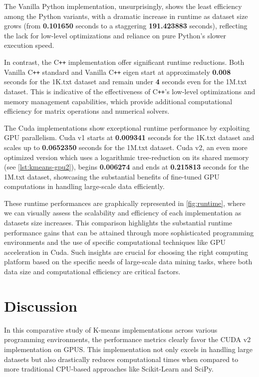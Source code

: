 \documentclass{article}
\begin{document}
  The {\sc Vanilla Python} implementation, unsurprisingly, shows the least efficiency
  among the {\sc Python} variants, with a dramatic increase in runtime as dataset
  size grows (from {\bf 0.101650} seconds to a staggering {\bf 191.423883} seconds),
  reflecting the lack for low-level optimizations and reliance on pure {\sc Python}'s
  slower execution speed. \medskip

  In contrast, the {\sc C{\tt ++}} implementation offer significant runtime reductions.
  Both {\sc Vanilla C{\tt++} standard} and {\sc Vanilla C{\tt++} eigen} start at
  approximately {\bf 0.008} seconds for the {\sf 1K.txt} dataset and remain under
  {\bf 4} seconds even for the {\sf 1M.txt} dataset. This is indicative of the
  effectiveness of C{\tt++}'s low-level optimizations and memory management capabilities,
  which provide additional computational efficiency for matrix operations and numerical
  solvers. \medskip

  The {\sc Cuda} implementations show exceptional runtime performance by exploiting
  {\sc GPU} parallelism. {\sc Cuda v1} starts at {\bf 0.009341} seconds for the
  {\sf 1K.txt} dataset and scales up to {\bf 0.0652350} seconds for the {\sf 1M.txt}
  dataset. {\sc Cuda v2}, an even more optimized version which uses a logarithmic
  tree-reduction on its shared memory (see \autoref{lst:kmeans-gpu2}), begins
  {\bf 0.006274} and ends at {\bf 0.215813} seconds for the {\sf 1M.txt} dataset,
  showcasing the substantial benefits of fine-tuned GPU computations in handling
  large-scale data efficiently. \medskip

  These runtime performances are graphically represented in \autoref{fig:runtime},
  where we can visually assess the scalability and efficiency of each implementation
  as datasets size increases. This comparison highlights the substantial runtime
  performance gains that can be attained through more sophisticated programming
  environments and the use of specific computational techniques like GPU acceleration
  in {\sc Cuda}. Such insights are crucial for choosing the right computing platform
  based on the specific needs of large-scale data mining tasks, where both data
  size and computational efficiency are critical factors.

  \section{Discussion}
  In this comparative study of {\sc K-means} implementations across various programming
  environments, the performance metrics clearly favor the {\sc CUDA v2} implementation
  on GPUS. This implementation not only excels in handling large datasets but also
  drastically reduces computational times when compared to more traditional CPU-based
  approaches like {\sc Scikit-Learn} and {\sc SciPy}. \medskip
\end{document}
